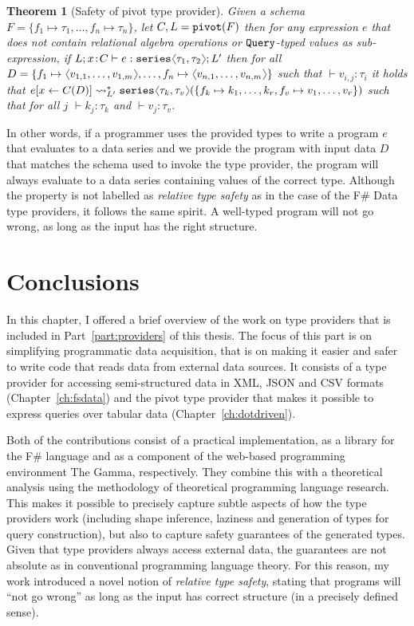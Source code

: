 \documentclass[fleqn,11pt]{report}
\newcommand{\ident}[1]{\textnormal{\ttfamily #1}}
\newcommand{\langl}{\begin{picture}(4.5,7)
\put(1.1,2.5){\rotatebox{60}{\line(1,0){5.5}}}
\put(1.1,2.5){\rotatebox{300}{\line(1,0){5.5}}}
\end{picture}}
\newcommand{\rangl}{\begin{picture}(4.5,7)
\put(.9,2.5){\rotatebox{120}{\line(1,0){5.5}}}
\put(.9,2.5){\rotatebox{240}{\line(1,0){5.5}}}
\end{picture}}
\newcommand{\vect}[1]{\langl #1 \rangl}
\newtheorem{theorem}{Theorem}
\theoremstyle{definition}
\begin{document}
\begin{theorem}[Safety of pivot type provider]
\label{thm:pivot-safe}
Given a schema $F=\{f_1\mapsto\tau_1, \ldots, f_n\mapsto\tau_n \}$, let $C,L=\ident{pivot}(F)$ then for any
expression $e$ that does not contain relational algebra operations or $\ident{Query}$-typed values as sub-expression,
if $L;x\!:\!C \vdash e : \ident{series}\langl\tau_1,\tau_2\rangl; L'$ then for all $D =
\{ f_1\mapsto\vect{v_{1,1},\ldots,v_{1,m}}, \ldots, f_n\mapsto\vect{v_{n,1},\ldots,v_{n,m}} \}$
such that $\vdash v_{i, j} : \tau_i$ it holds that $e[x\leftarrow C(D)]\leadsto_{L'}^{*}
  \ident{series}\langl\tau_k,\tau_v\rangl(\{ f_k\mapsto{k_1,\ldots,k_r}, f_v\mapsto{v_1,\ldots,v_r} \})$
  such that for all $j$ $\vdash k_j : \tau_k$ and $\vdash v_j : \tau_v$.
\end{theorem}

In other words, if a programmer uses the provided types to write a program $e$ that evaluates to
a data series and we provide the program with input data $D$ that matches the schema used to invoke
the type provider, the program will always evaluate to a data series containing values of the
correct type. Although the property is not labelled as \emph{relative type safety} as in the
case of the F\# Data type providers, it follows the same spirit. A well-typed program will not
go wrong, as long as the input has the right structure.

\section{Conclusions}
In this chapter, I offered a brief overview of the work on type providers that is included in
Part~\ref{part:providers} of this thesis. The focus of this part is on simplifying programmatic
data acquisition, that is on making it easier and safer to write code that reads data from external
data sources. It consists of a type provider for accessing semi-structured data in XML, JSON and
CSV formats (Chapter~\ref{ch:fsdata}) and the pivot type provider that makes it possible to
express queries over tabular data (Chapter~\ref{ch:dotdriven}).

Both of the contributions consist of a practical implementation, as a library for the F\# language and
as a component of the web-based programming environment The Gamma, respectively. They combine this
with a theoretical analysis using the methodology of theoretical programming language research.
This makes it possible to precisely capture subtle aspects of how the type providers work
(including shape inference, laziness and generation of types for query construction), but also
to capture safety guarantees of the generated types. Given that type providers always access
external data, the guarantees are not absolute as in conventional programming language theory.
For this reason, my work introduced a novel notion of \emph{relative type safety}, stating that
programs will ``not go wrong'' as long as the input has correct structure (in a precisely defined
sense).
\end{document}
